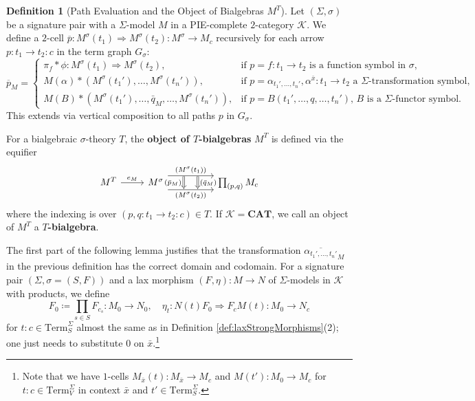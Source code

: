 \documentclass[11pt]{article}
\theoremstyle{plain}
\theoremstyle{definition}
\newtheorem{definition}[theorem]{Definition}
\numberwithin{equation}{section}
\newcommand{\K}{\mathcal{K}}
\newcommand{\Term}{\mathrm{Term}}
\newcommand{\CAT}{\mathbf{CAT}}
\begin{document}
\begin{definition}[Path Evaluation and the Object of Bialgebras $M^T$]
   Let $(\Sigma,\sigma)$ be a signature pair with a $\Sigma$-model $M$ in a PIE-complete $2$-category $\K$. We define a $2$-cell $\overline{p} \colon M^\sigma(t_1) \Rightarrow M^\sigma(t_2) \colon M^\sigma \to M_c$ recursively for each arrow $p \colon t_1 \to t_2 \colon c$ in the term graph $G_\sigma$:
   {\footnotesize
   $$
   \overline{p}_M = \begin{cases}
       \pi_f * \phi \colon M^\sigma(t_1) \Rightarrow M^\sigma(t_2), & \text{if $p = f \colon t_1 \to t_2$ is a function symbol in $\sigma$,} \\
       M(\alpha) * (M^\sigma(t_1'), \dots, M^{\sigma}(t_n')), & \text{if $p = \alpha_{t_1', \dots, t_n'}, \alpha^{\bar{x}}\colon t_1\to t_2$ a $\Sigma$-transformation symbol,} \\
       M(B) * (M^\sigma(t_1'), \dots, \bar{q}_M, \dots, M^\sigma(t_n')), & \text{if $p = B(t_1', \dots, q, \dots, t_n')$, $B$ is a $\Sigma$-functor symbol.}
   \end{cases}
   $$
   }
   This extends via vertical composition to all paths $p$ in $G_\sigma$.
   
   For a bialgebraic $\sigma$-theory $T$, the \textbf{object of $T$-bialgebras} $M^T$ is defined via the equifier
   $$
       \begin{tikzcd}[ampersand replacement=\&]
{M^T} \& {M^\sigma} \&\& {\prod_{(p,q)} M_c}
\arrow["{e_M}", from=1-1, to=1-2]
\arrow[""{name=0, anchor=center, inner sep=0}, "{(M^\sigma(t_1))}", shift left=3, from=1-2, to=1-4]
\arrow[""{name=1, anchor=center, inner sep=0}, "{(M^\sigma(t_2))}"', shift right=3, from=1-2, to=1-4]
\arrow["{(\bar{p}_M)}"', shift right=3, Rightarrow, from=0, to=1]
\arrow["{(\bar{q}_M)}", shift left=3, Rightarrow, from=0, to=1]
\end{tikzcd}
   $$
   where the indexing is over $(p,q\colon t_1\to t_2\colon c)\in T$. If $\K = \CAT$, we call an object of $M^T$ a \textbf{$T$-bialgebra}.
\end{definition}
The first part of the following lemma justifies that the transformation $\overline{\alpha_{t_1',\ldots, t_n'}}_M$ in the previous definition has the correct domain and codomain. For a signature pair
$(\Sigma,\sigma = (S,F))$ and a lax morphism $(F,\eta)\colon M\to N$ of $\Sigma$-models in $\K$ with products, we define 
$$
F_0\coloneqq  \prod_{s\in S} F_{c_s}\colon M_0\to N_0,\quad \eta_t\colon N(t)F_0\Rightarrow F_cM(t)\colon M_0\to N_c
$$
for $t\colon c\in \Term_S^\Sigma$ almost the same as in Definition \ref{def:laxStrongMorphisms}(2); one just needs to substitute $0$ on $\bar{x}$.\footnote{Note that we have $1$-cells $M_{\bar{x}}(t)\colon M_{\bar{x}}\to M_c$ and $M(t')\colon M_0\to M_c$ for $t\colon c\in \Term_V^\Sigma$ in context $\bar{x}$ and $t'\in \Term_S^\Sigma$.}
\end{document}
